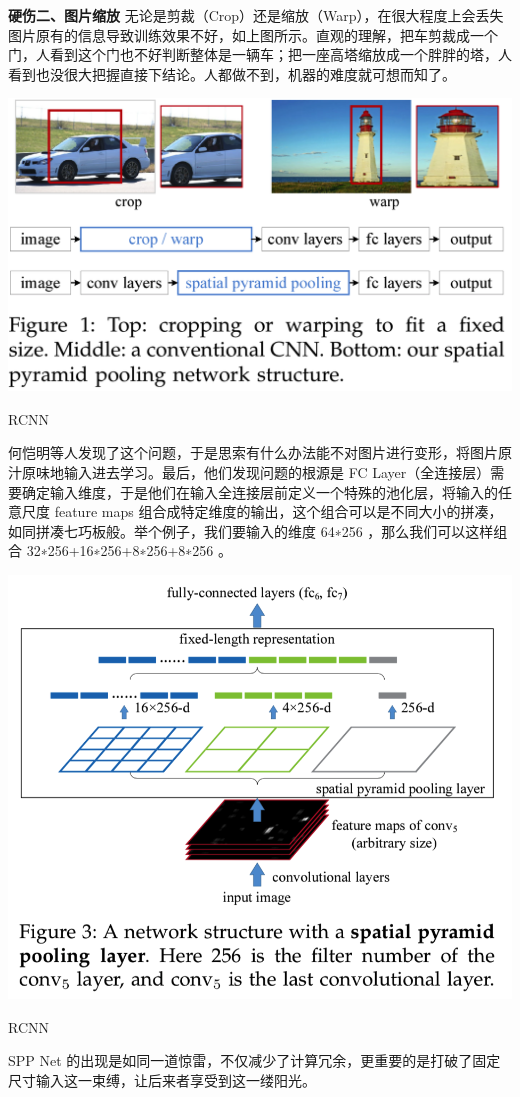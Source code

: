 \textbf{硬伤二、图片缩放}
无论是剪裁（Crop）还是缩放（Warp），在很大程度上会丢失图片原有的信息导致训练效果不好，如上图所示。直观的理解，把车剪裁成一个门，人看到这个门也不好判断整体是一辆车；把一座高塔缩放成一个胖胖的塔，人看到也没很大把握直接下结论。人都做不到，机器的难度就可想而知了。
\begin{uscfigure}
	\includegraphics[width=\textwidth]{./Pictures/sppnet_crop_warp.png}	
	\caption{RCNN}
\end{uscfigure}
何恺明等人发现了这个问题，于是思索有什么办法能不对图片进行变形，将图片原汁原味地输入进去学习。最后，他们发现问题的根源是 FC Layer（全连接层）需要确定输入维度，于是他们在输入全连接层前定义一个特殊的池化层，将输入的任意尺度 feature maps 组合成特定维度的输出，这个组合可以是不同大小的拼凑，如同拼凑七巧板般。举个例子，我们要输入的维度 64∗256 ，那么我们可以这样组合 32∗256+16∗256+8∗256+8∗256 。
\begin{uscfigure}
	\includegraphics[width=\textwidth]{./Pictures/sppnet_pool_layer.png}	
	\caption{RCNN}
\end{uscfigure}
SPP Net 的出现是如同一道惊雷，不仅减少了计算冗余，更重要的是打破了固定尺寸输入这一束缚，让后来者享受到这一缕阳光。

